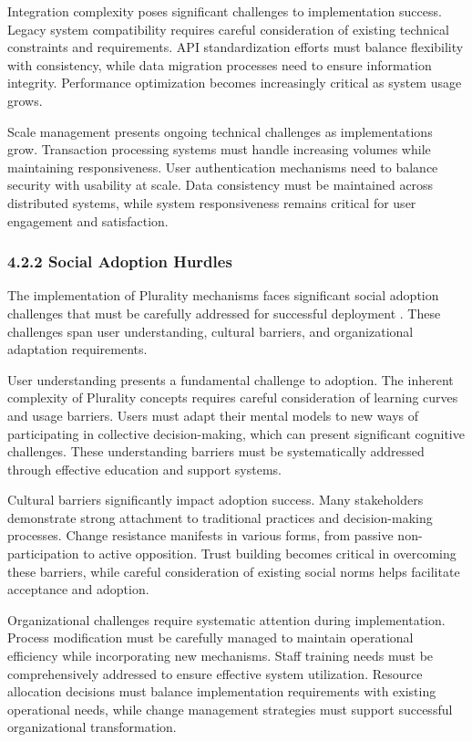 Integration complexity poses significant challenges to implementation success. Legacy system compatibility requires careful consideration of existing technical constraints and requirements. API standardization efforts must balance flexibility with consistency, while data migration processes need to ensure information integrity. Performance optimization becomes increasingly critical as system usage grows.

Scale management presents ongoing technical challenges as implementations grow. Transaction processing systems must handle increasing volumes while maintaining responsiveness. User authentication mechanisms need to balance security with usability at scale. Data consistency must be maintained across distributed systems, while system responsiveness remains critical for user engagement and satisfaction.

\hypertarget{social-adoption-hurdles}{%
\subsubsection{4.2.2 Social Adoption Hurdles}\label{social-adoption-hurdles}}

The implementation of Plurality mechanisms faces significant social adoption challenges that must be carefully addressed for successful deployment \citep{vtaiwan2023}. These challenges span user understanding, cultural barriers, and organizational adaptation requirements.

User understanding presents a fundamental challenge to adoption. The inherent complexity of Plurality concepts requires careful consideration of learning curves and usage barriers. Users must adapt their mental models to new ways of participating in collective decision-making, which can present significant cognitive challenges. These understanding barriers must be systematically addressed through effective education and support systems.

Cultural barriers significantly impact adoption success. Many stakeholders demonstrate strong attachment to traditional practices and decision-making processes. Change resistance manifests in various forms, from passive non-participation to active opposition. Trust building becomes critical in overcoming these barriers, while careful consideration of existing social norms helps facilitate acceptance and adoption.

Organizational challenges require systematic attention during implementation. Process modification must be carefully managed to maintain operational efficiency while incorporating new mechanisms. Staff training needs must be comprehensively addressed to ensure effective system utilization. Resource allocation decisions must balance implementation requirements with existing operational needs, while change management strategies must support successful organizational transformation.


